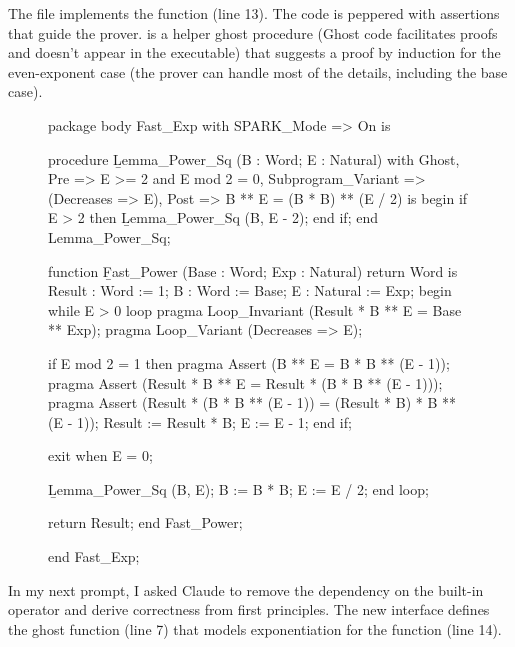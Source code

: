 \documentclass{article}
\begin{document}
The  file implements the  function (line 13).
The code is peppered with assertions that guide the prover.
 is a helper ghost procedure
(Ghost code facilitates proofs and doesn't appear in the executable)
that suggests a proof by induction for the even-exponent case
(the prover can handle most of the details, including the base case).

\begin{figure}
\begin{code}[linenumbers]
package body Fast\_Exp
  with SPARK\_Mode => On
is

   procedure \b{Lemma\_Power\_Sq} (B : Word; E : Natural)
     with Ghost, Pre => E >= 2 and E mod 2 = 0,
          Subprogram\_Variant => (Decreases => E),
          Post => B ** E = (B * B) ** (E / 2)
   is begin
      if E > 2 then \b{Lemma\_Power\_Sq} (B, E - 2); end if;
   end Lemma\_Power\_Sq;

   function \b{Fast\_Power} (Base : Word; Exp : Natural) return Word is
      Result : Word := 1;
      B      : Word := Base;
      E      : Natural := Exp;
   begin
      while E > 0 loop
         pragma Loop\_Invariant (Result * B ** E = Base ** Exp);
         pragma Loop\_Variant (Decreases => E);

         if E mod 2 = 1 then
            pragma Assert (B ** E = B * B ** (E - 1));
            pragma Assert (Result * B ** E = Result * (B * B ** (E - 1)));
            pragma Assert (Result * (B * B ** (E - 1)) =
                          (Result * B) * B ** (E - 1));
            Result := Result * B;
            E := E - 1;
         end if;

         exit when E = 0;

         \b{Lemma\_Power\_Sq} (B, E);
         B := B * B;
         E := E / 2;
      end loop;

      return Result;
   end Fast\_Power;

end Fast\_Exp;
\end{code}
\end{figure}


In my next prompt,
I asked Claude to remove the dependency on the built-in operator and derive correctness from first principles.
The new interface defines the ghost function  (line 7)
that models exponentiation for the  function (line 14).
\end{document}

